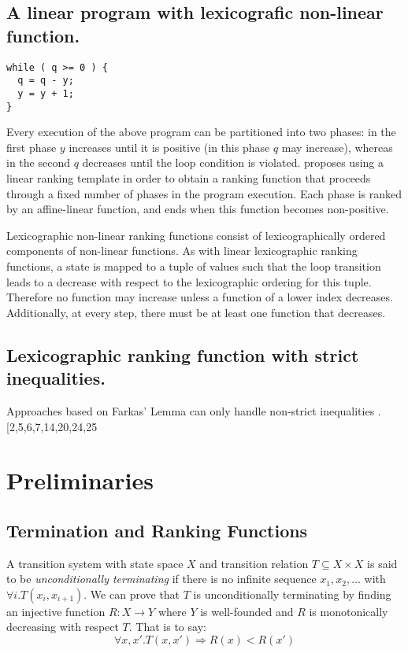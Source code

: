 \documentclass[preprint]{sigplanconf}
\theoremstyle{definition}
\begin{document}
\subsection{A linear program with lexicografic non-linear function.}
\begin{lstlisting}
while ( q >= 0 ) {
  q = q - y;
  y = y + 1;
}
\end{lstlisting}

Every execution of the above program can be partitioned into two phases: in the first phase $y$ increases
until it is positive (in this phase $q$ may increase), whereas in the second $q$ decreases until the loop condition is violated. 
\cite{DBLP:conf/tacas/LeikeH14} proposes using a linear ranking template in order to obtain a ranking function that proceeds
through a fixed number of phases in the program execution. Each phase is
ranked by an affine-linear function, and ends when this function becomes non-positive.


Lexicographic non-linear ranking functions consist of lexicographically ordered components
of non-linear functions. As with linear lexicographic ranking functions, a state is mapped to a tuple of values such that the
loop transition leads to a decrease with respect to the lexicographic
ordering for this tuple. Therefore no function may increase unless a function of
a lower index decreases. Additionally, at every step, there must be at least one
function that decreases.


\subsection{Lexicographic ranking function with strict inequalities.}
Approaches based on Farkas’ Lemma can only handle non-strict inequalities \cite{DBLP:conf/cav/BradleyMS05,DBLP:conf/vmcai/P04}.
[2,5,6,7,14,20,24,25

\section{Preliminaries}
\subsection{Termination and Ranking Functions}
A transition system with state space $X$ and transition relation $T \subseteq X \times X$
is said to be \emph{unconditionally terminating} if there is no infinite sequence
$x_1, x_2, \ldots$ with $\forall i . T(x_i, x_{i+1})$.  We can prove that $T$ is
unconditionally terminating by finding an injective function $R: X \to Y$ where
$Y$ is well-founded and $R$ is monotonically decreasing with respect $T$.  That is
to say:
$$\forall x, x' . T(x, x') \Rightarrow R(x) < R(x')$$
\end{document}

